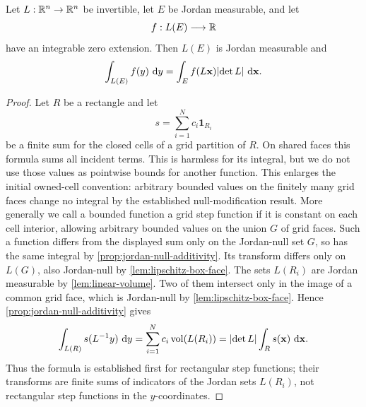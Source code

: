 \begin{theorem}
\label{thm:linear-change-variables}
Let $L:\mathbb{R}^n\to\mathbb{R}^n$ be invertible, let $E$ be Jordan measurable, and let
\[
f:L(E)\longrightarrow\mathbb{R}
\]
have an integrable zero extension.  Then $L(E)$ is Jordan measurable and
\[
\int_{L(E)}f(y)\,\mathop{}\!\mathrm{d} y
=
\int_Ef(L\mathbf{x})\lvert \det L\rvert\,\mathop{}\!\mathrm{d}\mathbf{x}.
\]
\end{theorem}
\begin{proof}
Let \(R\) be a rectangle and let
\[
s=\sum_{i=1}^{N}c_i\mathbf1_{R_i}
\]
be a finite sum for the closed cells of a grid partition of \(R\).
On shared faces this formula sums all incident terms. This is harmless for
its integral, but we do not use those values as pointwise bounds for another
function. This enlarges the initial owned-cell convention: arbitrary bounded values
on the finitely many grid faces change no integral by the established
null-modification result. More generally we call a bounded function a grid step function
if it is constant on each cell interior, allowing arbitrary bounded values
on the union $G$ of grid faces. Such a function differs from the displayed
sum only on the Jordan-null set $G$, so has the same integral by
\cref{prop:jordan-null-additivity}. Its transform differs only on $L(G)$,
also Jordan-null by \cref{lem:lipschitz-box-face}.
The sets \(L(R_i)\) are Jordan measurable by
\cref{lem:linear-volume}.  Two of them intersect only in the image of a
common grid face, which is Jordan-null by \cref{lem:lipschitz-box-face}.  Hence \cref{prop:jordan-null-additivity} gives
\[
\int_{L(R)}s(L^{-1}y)\,\mathop{}\!\mathrm{d} y
=
\sum_{i=1}^{N}c_i\operatorname{vol}(L(R_i))
=
\lvert \det L\rvert\int_Rs(\mathbf{x})\,\mathop{}\!\mathrm{d}\mathbf{x}.
\]
Thus the formula is established first for rectangular step functions; their
transforms are finite sums of indicators of the Jordan sets \(L(R_i)\),
not rectangular step functions in the \(y\)-coordinates.


\end{proof}
